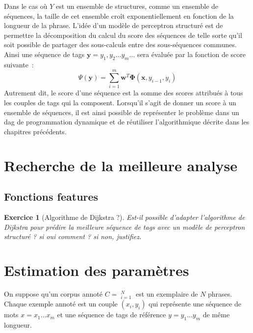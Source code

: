 \documentclass[11pt,openany]{book}
\newtheorem{exo}{Exercice}[chapter]
\newcommand{\ac}[1]{{\sc #1}} %
\begin{document}
Dans le cas où $Y$ est un ensemble de structures, comme un ensemble de
séquences, la taille de cet ensemble croît exponentiellement en
fonction de la longueur de la phrase. 
L'idée d'un modèle de perceptron structuré est de permettre la
décomposition du calcul du score des séquences de telle sorte qu'il
soit possible de partager des sous-calculs entre des sous-séquences communes.
Ainsi une séquence de tags $\mathbf{y} = y_1,y_2\ldots y_m\ldots $
sera évaluée par la fonction de score suivante~:
\begin{equation}
\Psi(\mathbf{y}) = \sum_{i=1}^m \mathbf{w}^T \boldsymbol\Phi(\mathbf{x},y_{i-1},y_i)
\end{equation}
Autrement dit, le score d'une séquence est la somme des scores
attribués à tous les couples de tags qui la composent. Lorsqu'il
s'agit de donner un score à un ensemble de séquences, il est ainsi
possible de représenter le problème dans un \ac{dag} de programmation
dynamique et de réutiliser l'algorithmique décrite dans les chapitres précédents.


\section{Recherche de la meilleure analyse}

\subsection{Fonctions features}


\begin{exo}[Algorithme de Dijkstra ?]
Est-il possible d'adapter l'algorithme de Dijkstra pour prédire la
meilleure séquence de tags avec un modèle de perceptron structuré ?
si oui comment ? si non, justifiez.
\end{exo}

\section{Estimation des paramètres}

On suppose qu’un corpus annoté $C = \mathop{(\mathbf{x}_i,\mathbf{y}_i)}^N_{i=1}$ est un
exemplaire de $N$ phrases. 
Chaque exemple annoté est un couple $(x_i , y_i )$ qui représente une
séquence de mots $x = x_1 \ldots x_m$ et une séquence de tags de
référence $y = y_1 \ldots y_m$ de même longueur.
\end{document}
